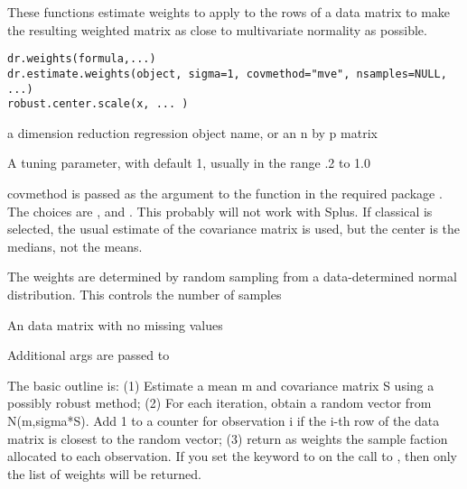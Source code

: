 \begin{Description}\relax
These functions estimate weights to apply to the rows of a data matrix to
make the resulting weighted matrix as close to multivariate normality as
possible.\end{Description}
\begin{Usage}
\begin{verbatim}
dr.weights(formula,...)
dr.estimate.weights(object, sigma=1, covmethod="mve", nsamples=NULL, ...)
robust.center.scale(x, ... )
\end{verbatim}
\end{Usage}
\begin{Arguments}
\begin{ldescription}
\item[\code{object}] a dimension reduction regression object name, or an n by p matrix
\item[\code{sigma}] A tuning parameter, with default 1, usually in the range .2
to 1.0
\item[\code{covmethod}] covmethod is passed as the argument  
to the function  in the required package
.  The choices are ,
 and .  This probably will not work with Splus.
If classical is selected, the usual estimate of the covariance matrix is
used, but the center is the medians, not the means.
\item[\code{nsamples}] The weights are determined by random sampling from a
data-determined normal distribution.  This controls the number of samples
\item[\code{x}] An  data matrix with no missing values
\item[\code{...}] Additional args are passed to 
\end{ldescription}
\end{Arguments}
\begin{Details}\relax
The basic outline is:  (1) Estimate a mean m and covariance matrix S using a
possibly robust method; (2) For each iteration, obtain a random vector
from N(m,sigma*S).  Add 1 to a counter for observation i if the i-th row
of the data matrix is closest to the random vector; (3) return as weights
the sample faction allocated to each observation.  If you set the keyword
 to  on the call to , then only the
list of weights will be returned.\end{Details}

